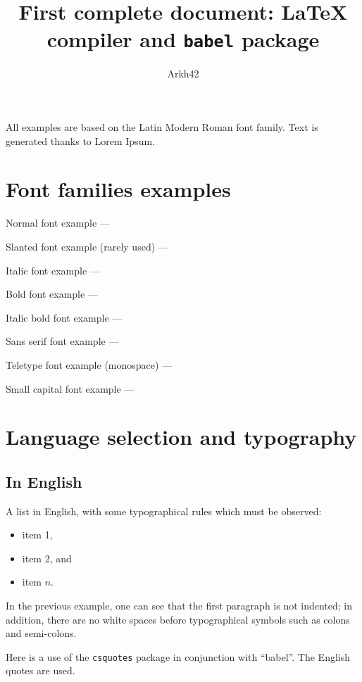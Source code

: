 \documentclass[11pt, a4paper, english]{article}
\author{Arkh42}
\title{First complete document: \LaTeX{} compiler and \texttt{babel} package}
\begin{document}
	
	
	\maketitle
	

	All examples are based on the Latin Modern Roman font family.
	Text is generated thanks to Lorem Ipsum.
	
	
	\section{Font families examples}
	
		Normal font example --- \lipsum[1]
		
		Slanted font example (rarely used) --- \textsl{\lipsum[1]}
		
		Italic font example --- \textit{\lipsum[1]}
		
		Bold font example --- \textbf{\lipsum[1]}
		
		Italic bold font example --- \textbf{\textit{\lipsum[1]}}
		
		Sans serif font example --- \textsf{\lipsum[1]}
		
		Teletype font example (monospace) --- \texttt{\lipsum[1]}
		
		Small capital font example --- \textsc{\lipsum[1]}
		
	
	\section{Language selection and typography}
	
		
		\subsection{In English}
		
			A list in English, with some typographical rules which must be observed:
			\begin{itemize}
				\item item 1,
				\item item 2, and
				\item item $n$.
			\end{itemize}
		
			In the previous example, one can see that the first paragraph is not indented; in addition, there are no white spaces before typographical symbols such as colons and semi-colons.
			
			Here is a use of the \texttt{csquotes} package in conjunction with \enquote{babel}. The English quotes are used. 
	
\end{document}
